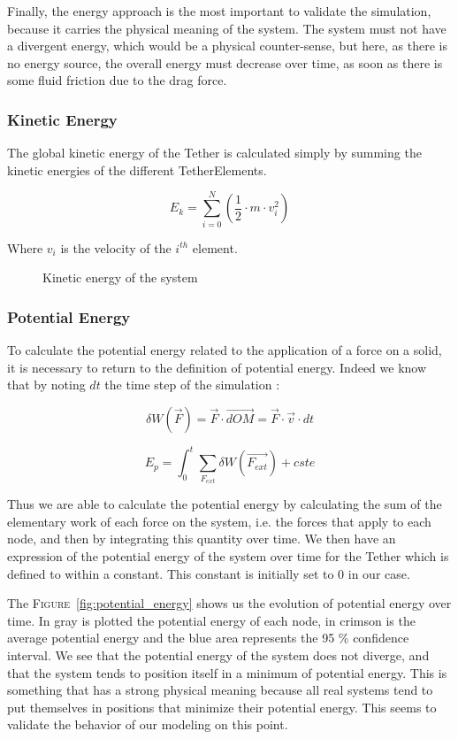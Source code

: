 Finally, the energy approach is the most important to validate the simulation, because it carries the physical meaning of the system. The system must not have a divergent energy, which would be a physical counter-sense, but here, as there is no energy source, the overall energy must decrease over time, as soon as there is some fluid friction due to the drag force.

\subsubsection{Kinetic Energy}

The global kinetic energy of the Tether is calculated simply by summing the kinetic energies of the different TetherElements.

$$E_{k} = \sum_{i=0}^N \left(\frac{1}{2} \cdot m \cdot v_i^2 \right)$$

Where $v_i$ is the velocity of the $i^{th}$ element.

\begin{figure}
    \centering
    
    \caption{Kinetic energy of the system}
    \label{fig:kinetic_energy}
\end{figure}

\subsubsection{Potential Energy}

To calculate the potential energy related to the application of a force on a solid, it is necessary to return to the definition of potential energy. Indeed we know that by noting $dt$ the time step of the simulation :

$$\delta W(\overrightarrow{F}) = \overrightarrow{F} \cdot \overrightarrow{dOM} = \overrightarrow{F} \cdot \overrightarrow{v} \cdot dt$$

$$E_p = \int_0^t \sum_{F_{ext}} \delta W(\overrightarrow{F_{ext}}) + cste$$

Thus we are able to calculate the potential energy by calculating the sum of the elementary work of each force on the system, i.e. the forces that apply to each node, and then by integrating this quantity over time. We then have an expression of the potential energy of the system over time for the Tether which is defined to within a constant. This constant is initially set to $0$ in our case.

The \textsc{Figure}~\ref{fig:potential_energy} shows us the evolution of potential energy over time. In gray is plotted the potential energy of each node, in crimson is the average potential energy and the blue area represents the 95 \% confidence interval. We see that the potential energy of the system does not diverge, and that the system tends to position itself in a minimum of potential energy. This is something that has a strong physical meaning because all real systems tend to put themselves in positions that minimize their potential energy. This seems to validate the behavior of our modeling on this point.

